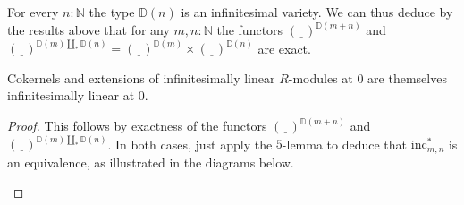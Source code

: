 For every $n : \mathbb{N}$ the type $\mathbb{D}(n)$ is an infinitesimal variety.
We can thus deduce by the results above that for any $m,n : \mathbb{N}$ the functors $(\underline{\phantom{Y}})^{\mathbb{D}(m+n)}$ and $(\underline{\phantom{Y}})^{\mathbb{D}(m)\underset{\ast}{\coprod}\mathbb{D}(n)} = (\underline{\phantom{Y}})^{\mathbb{D}(m)} \times (\underline{\phantom{Y}})^{\mathbb{D}(n)}$ are exact.

\begin{proposition}
  Cokernels and extensions of infinitesimally linear $R$-modules at $0$ are themselves infinitesimally linear at $0$.
\end{proposition}

\begin{proof}
  This follows by exactness of the functors $(\underline{\phantom{Y}})^{\mathbb{D}(m+n)}$ and $(\underline{\phantom{Y}})^{\mathbb{D}(m)\underset{\ast}{\coprod}\mathbb{D}(n)}$.
  In both cases, just apply the $5$-lemma to deduce that $\mathrm{inc}_{m,n}^\ast$ is an equivalence, as illustrated in the diagrams below.
  \begin{center}
    \qquad
  \end{center}
  \phantom{M}
\end{proof}

